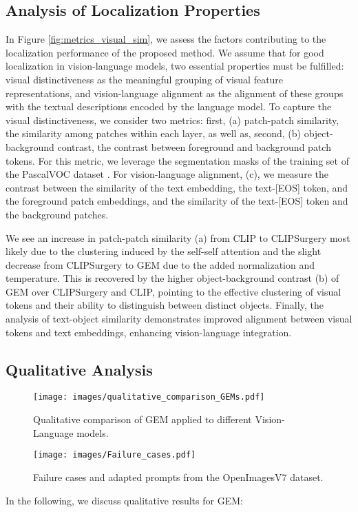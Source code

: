 \documentclass[10pt,twocolumn,letterpaper]{article}
\begin{document}
\subsection{Analysis of Localization Properties}\label{sec:analysis}
In Figure \ref{fig:metrics_visual_sim}, we assess the factors contributing to the localization performance of the proposed method. We assume that for good localization in vision-language models, two essential properties must be fulfilled: visual distinctiveness as the meaningful grouping of visual feature representations, and vision-language alignment as the alignment of these groups with the textual descriptions encoded by the language model. 
To capture the visual distinctiveness, we consider two metrics: first, (a) patch-patch similarity, the similarity among patches within each layer, as well as, second, (b) object-background contrast, the contrast between foreground and background patch tokens. For this metric, we leverage the segmentation masks of the training set of the PascalVOC dataset \citep{everingham2010pascal}.
For vision-language alignment, (c), we measure the contrast between the similarity of the text embedding, the text-[EOS] token, and the foreground patch embeddings, and the similarity of the text-[EOS] token and the background patches.

We see an increase in patch-patch similarity (a) from CLIP to CLIPSurgery most likely due to the clustering induced by the self-self attention and the slight decrease from CLIPSurgery to GEM due to the added normalization and temperature. 
This is recovered by the higher object-background contrast (b) of GEM over CLIPSurgery and CLIP, pointing to the effective clustering of visual tokens and their ability to distinguish between distinct objects. 
Finally, the analysis of text-object similarity demonstrates improved alignment between visual tokens and text embeddings, enhancing vision-language integration. 
\subsection{Qualitative Analysis}\label{appendix:qualitative_analysis}
\begin{figure}[t]
\centering
      \texttt{[image: images/qualitative\_comparison\_GEMs.pdf]}
     \caption{Qualitative comparison of GEM applied to different Vision-Language models.}\label{fig:GEMs_comparison}
\end{figure}
\begin{figure}
  \begin{center}
    \texttt{[image: images/Failure\_cases.pdf]}
  \end{center}
  \vspace{-7mm}
  \caption{Failure cases and adapted prompts from the OpenImagesV7 dataset.}\label{fig:failure-cases}
\end{figure}
In the following, we discuss qualitative results for GEM:
\vspace{-1em}
\end{document}
